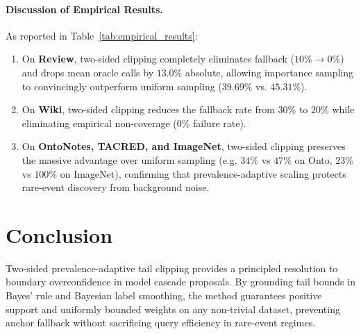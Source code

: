 \documentclass[11pt,a4paper]{article}
\begin{document}
\paragraph{Discussion of Empirical Results.}
As reported in Table~\ref{tab:empirical_results}:
\begin{enumerate}[leftmargin=*]
    \item On \textbf{Review}, two-sided clipping completely eliminates fallback ($10\% \to 0\%$) and drops mean oracle calls by $13.0\%$ absolute, allowing importance sampling to convincingly outperform uniform sampling ($39.69\%$ vs. $45.31\%$).
    \item On \textbf{Wiki}, two-sided clipping reduces the fallback rate from $30\%$ to $20\%$ while eliminating empirical non-coverage ($0\%$ failure rate).
    \item On \textbf{OntoNotes, TACRED, and ImageNet}, two-sided clipping preserves the massive advantage over uniform sampling (e.g. $34\%$ vs $47\%$ on Onto, $23\%$ vs $100\%$ on ImageNet), confirming that prevalence-adaptive scaling protects rare-event discovery from background noise.
\end{enumerate}

\section{Conclusion}
Two-sided prevalence-adaptive tail clipping provides a principled resolution to boundary overconfidence in model cascade proposals. By grounding tail bounds in Bayes' rule and Bayesian label smoothing, the method guarantees positive support and uniformly bounded weights on any non-trivial dataset, preventing anchor fallback without sacrificing query efficiency in rare-event regimes.
\end{document}
